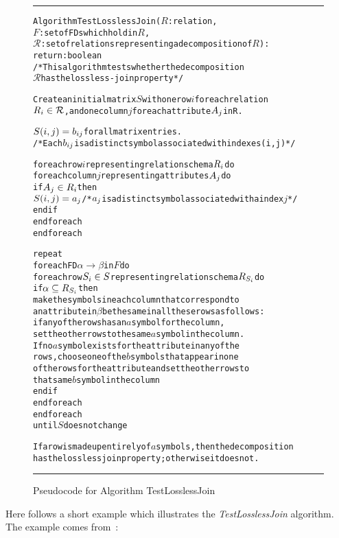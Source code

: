 \begin{figure}[htbp]
\hrule
\vspace{0.25cm}
\begin{alltt}
Algorithm TestLosslessJoin(\(R\): relation,
              \(F\): set of FDs which hold in \(R\),
              \(\mathcal{R}\): set of relations representing a decomposition of \(R\)):
        return: boolean
/* This algorithm tests whether the decomposition 
\(\mathcal{R}\) has the lossless-join property */
  
  Create an initial matrix \(S\) with one row \(i\) for each relation 
  \(R\sb{i} \in \mathcal{R}\), and one column \(j\) for each attribute \(A\sb{j}\) in R.  
  
   
  \(S(i, j) = b\sb{ij}\) for all matrix entries. 
  /* Each \(b\sb{ij}\) is a distinct symbol associated with indexes (i,j)*/
  
  foreach row \(i\) representing relation schema \(R\sb{i}\) do
    foreach column \(j\) representing attributes \(A\sb{j}\) do
      if \(A\sb{j} \in R\sb{i}\) then
        \(S(i, j) = a\sb{j}\) /* \(a\sb{j}\) is a distinct symbol associated with a index \(j\) */
      end if
    end foreach
  end foreach
  
  repeat
    foreach FD \(\alpha \rightarrow \beta\) in \(F\) do
      foreach row \(S\sb{i} \in S\) representing relation schema \(R\sb{S\sb{i}}\) do
        if \(\alpha \subseteq R\sb{S\sb{i}}\) then
          make the symbols in each column that correspond to
          an attribute in \(\beta\) be the same in all these rows as follows:
          if any of the rows has an \(a\) symbol for the column,
          set the other rows to the same \(a\) symbol in the column.
          If no \(a\) symbol exists for the attribute in any of the
          rows, choose one of the \(b\) symbols that appear in one
          of the rows for the attribute and set the other rows to
          that same \(b\) symbol in the column
        end if
      end foreach
    end foreach
  until \(S\) does not change
                  
If a row is made up entirely of \(a\) symbols, then the decomposition 
has the lossless join property; otherwise it does not.
\end{alltt}
\caption{Pseudocode for Algorithm TestLosslessJoin}\label{alg:lossless}
\hrule
\end{figure}

\vspace{1.5cm}

Here follows a short example which illustrates the \textit{TestLosslessJoin} algorithm. 
The example comes from~\cite[Figure 11.1]{bdb1}:


